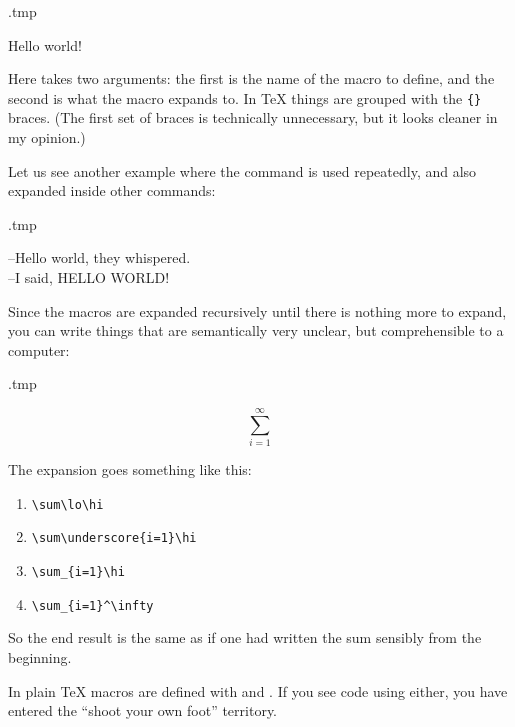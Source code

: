 \begin{VerbatimOut}{\jobname.tmp}
\newcommand{\hello}{Hello world!}

\hello
\end{VerbatimOut}
\ShowExample

Here  takes two arguments:
the first is the name of the macro to define, and the second is what the macro expands to.
In \TeX{} things are grouped with the \verb|{}| braces.
(The first set of braces is technically unnecessary, but it looks cleaner in my opinion.)

Let us see another example where the command is used repeatedly,
and also expanded inside other commands:
\begin{VerbatimOut}{\jobname.tmp}
\newcommand{\hello}{Hello world}

--\hello, they whispered.\\
--I said, \MakeUppercase{\hello}!
\end{VerbatimOut}
\ShowExample

Since the macros are expanded recursively until there is nothing more to expand,
you can write things that are semantically very unclear,
but comprehensible to a computer:
\begin{VerbatimOut}{\jobname.tmp}
\newcommand{\hi}{^\infty}
\newcommand{\underscore}{_}
\newcommand{\lo}{\underscore{i=1}}

\[ \sum\lo\hi \]
\end{VerbatimOut}
\ShowExample
%
The expansion goes something like this:
\begin{enumerate}
    \item \verb|\sum\lo\hi|
    \item \verb|\sum\underscore{i=1}\hi|
    \item \verb|\sum_{i=1}\hi|
    \item \verb|\sum_{i=1}^\infty|
\end{enumerate}
So the end result is the same as if one had written the sum sensibly from the beginning.



\begin{warning}
In plain \TeX{} macros are defined with  and .
If you see code using either,
you have entered the ``shoot your own foot'' territory.\footnotemark
\end{warning}


